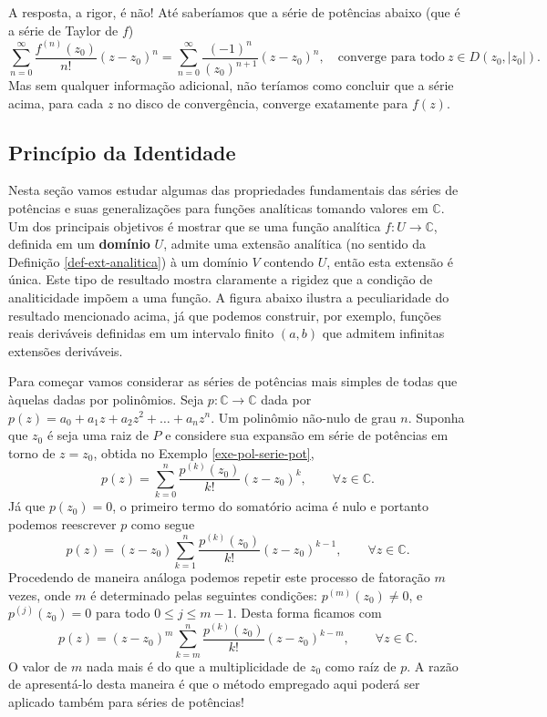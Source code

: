 A resposta, a rigor, é não! Até saberíamos que a série de potências
abaixo (que é a série de Taylor de $f$)
\[
\sum_{n=0}^{\infty} \frac{f^{(n)}(z_0)}{n!} (z-z_0)^n
=
\sum_{n=0}^{\infty}\frac{(-1)^n}{(z_0)^{n+1}} (z-z_0)^n,
\quad \text{converge para todo} \ z\in D(z_0,|z_0|).
\]
Mas sem qualquer informação adicional, não teríamos 
como concluir que a série acima, para cada $z$ no disco de convergência,
converge exatamente para $f(z)$. 

\subsection{Princípio da Identidade}

Nesta seção vamos estudar algumas das propriedades fundamentais 
das séries de potências e suas generalizações para funções analíticas
tomando valores em $\mathbb{C}$. 
Um dos principais objetivos é mostrar que se uma função analítica
$f:U\to\mathbb{C}$, definida em um \textbf{domínio} $U$, admite 
uma extensão analítica (no sentido da Definição \ref{def-ext-analitica}) 
à um domínio $V$ contendo $U$, então esta extensão é única.   
Este tipo de resultado mostra claramente a rigidez que a condição 
de analiticidade impõem a uma função. A figura abaixo
ilustra a peculiaridade do resultado mencionado acima, 
já que podemos construir, por exemplo, funções reais deriváveis definidas em 
um intervalo finito $(a,b)$ que 
admitem infinitas extensões deriváveis.



\bigskip 


Para começar vamos considerar as séries de potências mais simples
de todas que àquelas dadas por polinômios.
Seja $p:\mathbb{C}\to\mathbb{C}$ dada por $p(z)=a_0+a_1z+a_2z^2+\ldots+a_nz^n$.
Um polinômio não-nulo de grau $n$. Suponha que $z_0$ é seja uma raiz de $P$ e
considere sua expansão em série de potências em torno de $z=z_0$, obtida no 
Exemplo \ref{exe-pol-serie-pot},
\[
p(z) = \sum_{k=0}^{n} \frac{p^{(k)}(z_0)}{k!}(z-z_0)^k, \qquad \forall z\in\mathbb{C}.
\] 
Já que $p(z_0)=0$, o primeiro termo do somatório acima é nulo e  
portanto podemos reescrever $p$ como segue
\[
p(z)=(z-z_0)\sum_{k=1}^{n} \frac{p^{(k)}(z_0)}{k!}(z-z_0)^{k-1}, \qquad \forall z\in\mathbb{C}.
\]
Procedendo de maneira análoga podemos repetir este processo de fatoração $m$ vezes, 
onde $m$ é determinado pelas seguintes condições:
$p^{(m)}(z_0)\neq 0$, e $p^{(j)}(z_0)=0$ para todo $0\leqslant j\leqslant m-1$. 
Desta forma ficamos com
\[
p(z)=
(z-z_0)^m
\sum_{k=m}^{n} \frac{p^{(k)}(z_0)}{k!}(z-z_0)^{k-m}, \qquad \forall z\in\mathbb{C}.
\]
O valor de $m$ nada mais é do que a multiplicidade de $z_0$ como raíz de $p$.
A razão de apresentá-lo desta maneira é que o método empregado aqui poderá 
ser aplicado também para séries de potências! 

